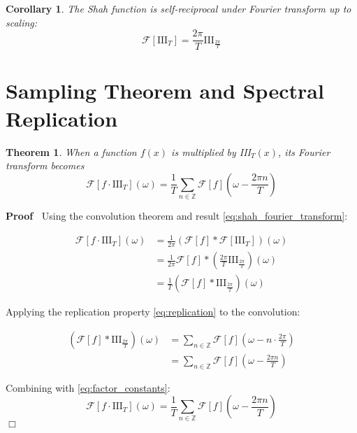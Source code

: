 \documentclass{article}
\newcommand{\cdummy}{\cdot}
\newenvironment{proof}{\noindent\textbf{Proof\ }}{\hspace*{\fill}$\Box$\medskip}
\newtheorem{corollary}{Corollary}
\newtheorem{theorem}{Theorem}
\begin{document}
\begin{corollary}
  \label{cor:shah_self_reciprocal}The Shah function is self-reciprocal under
  Fourier transform up to scaling:
  \begin{equation}
    \label{eq:self_reciprocal} \mathcal{F} [\text{III}_T] = \frac{2 \pi}{T}
    \text{III}_{\frac{2 \pi}{T}}
  \end{equation}
\end{corollary}

\section{Sampling Theorem and Spectral Replication}

\begin{theorem}
  \label{thm:sampling_spectral}When a function $f (x)$ is multiplied by III$_T
  (x)$, its Fourier transform becomes
  \begin{equation}
    \label{eq:sampling_spectrum} \mathcal{F} [f \cdummy \text{III}_T] (\omega)
    = \frac{1}{T}  \sum_{n \in \mathbb{Z}} \mathcal{F} [f]  \left( \omega -
    \frac{2 \pi n}{T} \right)
  \end{equation}
\end{theorem}

\begin{proof}
  Using the convolution theorem and result \eqref{eq:shah_fourier_transform}:
  
  \begin{align}
    \mathcal{F} [f \cdummy \text{III}_T] (\omega) & = \frac{1}{2 \pi} 
    (\mathcal{F}[f] \ast \mathcal{F}[\text{III}_T]) (\omega) 
    \label{eq:convolution_theorem}\\
    & = \frac{1}{2 \pi} \mathcal{F} [f] \ast \left( \frac{2 \pi}{T}
    \text{III}_{\frac{2 \pi}{T}} \right) (\omega) 
    \label{eq:substitute_shah_fourier}\\
    & = \frac{1}{T} (\mathcal{F} [f] \ast \text{III}_{\frac{2 \pi}{T}})
    (\omega)  \label{eq:factor_constants}
  \end{align}
  
  Applying the replication property \eqref{eq:replication} to the convolution:
  
  \begin{align}
    (\mathcal{F} [f] \ast \text{III}_{\frac{2 \pi}{T}}) (\omega) & = \sum_{n
    \in \mathbb{Z}} \mathcal{F} [f]  \left( \omega - n \cdot \frac{2 \pi}{T}
    \right)  \label{eq:replication_applied}\\
    & = \sum_{n \in \mathbb{Z}} \mathcal{F} [f]  \left( \omega - \frac{2 \pi
    n}{T} \right)  \label{eq:index_order}
  \end{align}
  
  Combining with \eqref{eq:factor_constants}:
  \begin{equation}
    \label{eq:final_sampling_spectrum} \mathcal{F} [f \cdummy \text{III}_T]
    (\omega) = \frac{1}{T}  \sum_{n \in \mathbb{Z}} \mathcal{F} [f]  \left(
    \omega - \frac{2 \pi n}{T} \right)
  \end{equation}
\end{proof}
\end{document}
